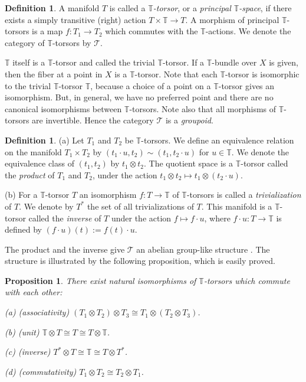 \documentclass[a4paper,a4paper]{article}
\newtheorem{prop}[thm]{Proposition}
\theoremstyle{definition}
\newtheorem{dfn}[thm]{Definition}
\theoremstyle{remark}
\newcommand{\T}{\mathbb{T}}
\newcommand{\sT}{\mathcal{T}}
\begin{document}
\begin{dfn} \label{dfn_torsor}
A manifold $T$ is called a \textit{$\T$-torsor}, or a \textit{principal $\T$-space}, if there exists a simply transitive (right) action $T \times \T \to T$. A morphism of principal $\T$-torsors is a map $f : T_1 \to T_2$ which commutes with the $\T$-actions. We denote the category of $\T$-torsors by $\sT$.
\end{dfn}

$\T$ itself is a $\T$-torsor and called the trivial $\T$-torsor. If a $\T$-bundle over $X$ is given, then the fiber at a point in $X$ is a $\T$-torsor. Note that each $\T$-torsor is isomorphic to the trivial $\T$-torsor $\T$, because a choice of a point on a $\T$-torsor gives an isomorphism. But, in general, we have no preferred point and there are no canonical isomorphisms between $\T$-torsors. Note also that all morphisms of $\T$-torsors are invertible. Hence the category $\sT$ is a \textit{groupoid}.

\begin{dfn}
(a) Let $T_1$ and $T_2$ be $\T$-torsors. We define an equivalence relation on the manifold $T_1 \times T_2$ by $\left( t_1 \cdot u, t_2 \right) \sim \left( t_1, t_2 \cdot u \right)$ for $u \in \T$. We denote the equivalence class of $(t_1, t_2)$ by $t_1 \otimes t_2$. The quotient space is a $\T$-torsor called the \textit{product} of $T_1$ and $T_2$, under the action $t_1 \otimes t_2 \mapsto t_1 \otimes (t_2 \cdot u)$. 

(b) For a $\T$-torsor $T$ an isomorphism $f : T \to \T$ of $\T$-torsors is called a \textit{trivialization} of $T$. We denote by $T^*$ the set of all trivializations of $T$. This manifold is a $\T$-torsor called the \textit{inverse} of $T$ under the action $f \mapsto f \cdot u$, where $f \cdot u : T \to \T$ is defined by $(f \cdot u)(t) := f(t) \cdot u$. 
\end{dfn}

The product and the inverse give $\sT$ an abelian group-like structure \cite{F2}. The structure is illustrated by the following proposition, which is easily proved.

\begin{prop} \label{prop_agls_torsors}
There exist natural isomorphisms of $\T$-torsors which commute with each other: 

(a) (associativity) $(T_1 \otimes T_2) \otimes T_3 \cong T_1 \otimes (T_2 \otimes T_3)$.

(b) (unit) $\T \otimes T \cong T \cong T \otimes \T$.

(c) (inverse) $T^* \otimes T \cong \T \cong T \otimes T^*$.

(d) (commutativity) $T_1 \otimes T_2 \cong T_2 \otimes T_1$.
\end{prop}
\end{document}
